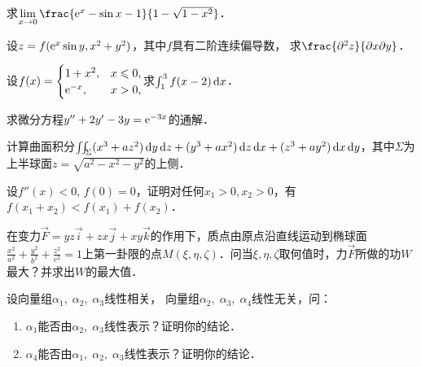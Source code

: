 \documentclass[plain,noanswer,medmath]{../../template/jnuexam}
\begin{document}


\begin{problem}
求$\lim_{x \to 0} \frac{\e^x - \sin x - 1}{1 - \sqrt{1 - x^2}}$．
\end{problem}


\begin{problem}
设$z = f(\mathrm{e}^x\sin y, x^2 + y^2)$，其中$f$具有二阶连续偏导数，
求$\frac{\pd^2 z}{\pdx\pd y}$．
\end{problem}


\begin{problem}
设$f(x) = \begin{cases}
  1 + x^2, & x \leqslant 0, \\
 \mathrm{e}^{- x}, & x > 0, \\
\end{cases}$求$\int_1^3f(x - 2) \mathop{}\!\mathrm{d} x$．
\end{problem}



\begin{problem}
求微分方程$y'' + 2y' - 3y = \mathrm{e}^{- 3x}$的通解．
\end{problem}



\begin{problem}
计算曲面积分$\iint_{\Sigma}(x^3 + az^2)\mathop{}\!\mathrm{d} y\mathop{}\!\mathrm{d} z + (y^3 + ax^2)\mathop{}\!\mathrm{d} z\mathop{}\!\mathrm{d} x + (z^3 + ay^2)\mathop{}\!\mathrm{d} x\mathop{}\!\mathrm{d} y$，其中$\Sigma$为上半球面$z = \sqrt{a^2 - x^2 - y^2}$的上侧．
\end{problem}



\begin{problem}
设$f''(x) < 0$, $f(0) = 0$，证明对任何$x_1 > 0,x_2 > 0$，有$f(x_1 + x_2) < f(x_1) + f(x_2)$．
\end{problem}



\begin{problem}
在变力$\vec{F}= yz\vec{i}+ zx\vec{j}+ xy\vec{k}$的作用下，质点由原点沿直线运动到椭球面$\frac{x^2}{a^2} + \frac{y^2}{b^2} + \frac{z^2}{c^2} = 1$上第一卦限的点$M(\xi ,\eta ,\zeta)$．问当$\xi ,\eta ,\zeta$取何值时，力$\vec{F}$所做的功$W$最大？并求出$W$的最大值．
\end{problem}



\begin{problem}
设向量组$\alpha_1,\;\alpha_2,\;\alpha_3$线性相关，
向量组$\alpha_2,\;\alpha_3,\;\alpha_4$线性无关，问：
\begin{enumerate}
\item $\alpha_1$能否由$\alpha_2,\;\alpha_3$线性表示？证明你的结论．
\item $\alpha_4$能否由$\alpha_1,\;\alpha_2,\;\alpha_3$线性表示？证明你的结论．
\end{enumerate}
\end{problem}
\end{document}
